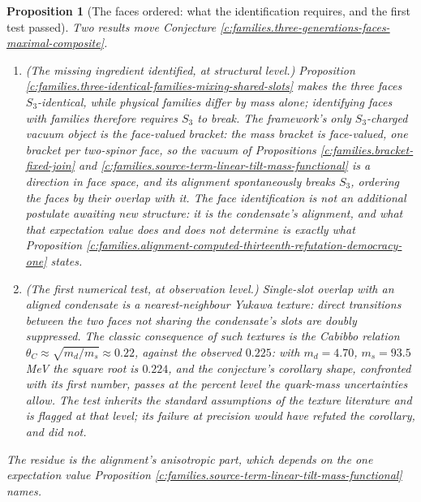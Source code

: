 \documentclass[11pt]{article}
\newtheorem{proposition}[theorem]{Proposition}
\theoremstyle{definition}
\theoremstyle{plain}
\newcommand{\changedmark}[2]{\marginpar{\raggedright\scriptsize\color{#1}#2}}
\begin{document}
\begin{proposition}[The faces ordered: what the identification requires, and the first test passed]\label{c:families.faces-ordered-what-identification-requires-first}
\changedmark{gray}{reworded}
Two results move Conjecture \ref{c:families.three-generations-faces-maximal-composite}.
\begin{enumerate}
\item \emph{(The missing ingredient identified, at structural level.)} Proposition \ref{c:families.three-identical-families-mixing-shared-slots} makes the three faces $S_{3}$-identical, while physical families differ by mass alone; identifying faces with families therefore requires $S_{3}$ to break. The framework's only $S_{3}$-charged vacuum object is the face-valued bracket: the mass bracket is face-valued, one bracket per two-spinor face, so the vacuum of Propositions \ref{c:families.bracket-fixed-join} and \ref{c:families.source-term-linear-tilt-mass-functional} is a direction in face space, and its alignment spontaneously breaks $S_{3}$, ordering the faces by their overlap with it. The face identification is not an additional postulate awaiting new structure: it is the condensate's alignment, and what that expectation value does and does not determine is exactly what Proposition \ref{c:families.alignment-computed-thirteenth-refutation-democracy-one} states.
\item \emph{(The first numerical test, at observation level.)} Single-slot overlap with an aligned condensate is a nearest-neighbour Yukawa texture: direct transitions between the two faces not sharing the condensate's slots are doubly suppressed. The classic consequence of such textures is the Cabibbo relation $\theta_{C} \approx \sqrt{m_{d}/m_{s}} \approx 0.22$, against the observed $0.225$: with $m_{d} = 4.70$, $m_{s} = 93.5$ MeV \cite{PDG2024} the square root is $0.224$, and the conjecture's corollary shape, confronted with its first number, passes at the percent level the quark-mass uncertainties allow. The test inherits the standard assumptions of the texture literature and is flagged at that level; its failure at precision would have refuted the corollary, and did not.
\end{enumerate}
The residue is the alignment's anisotropic part, which depends on the one expectation value Proposition \ref{c:families.source-term-linear-tilt-mass-functional} names.
\end{proposition}
\end{document}
